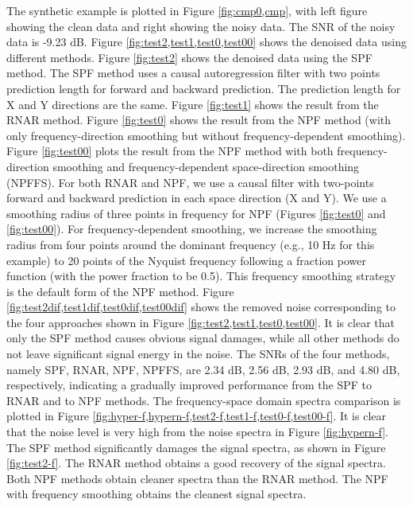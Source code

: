 The synthetic example is plotted in Figure \ref{fig:cmp0,cmp}, with left figure showing the clean data and right showing the noisy data. The SNR of the noisy data is -9.23 dB. Figure \ref{fig:test2,test1,test0,test00} shows the denoised data using different methods. Figure \ref{fig:test2} shows the denoised data using the SPF method. The SPF method uses a causal autoregression filter with two points prediction length for forward and backward prediction. The prediction length for X and Y directions are the same. Figure \ref{fig:test1} shows the result from the RNAR method. Figure \ref{fig:test0} shows the result from the NPF method (with only frequency-direction smoothing but without frequency-dependent smoothing). Figure \ref{fig:test00} plots the result from the NPF method with both frequency-direction smoothing and frequency-dependent space-direction smoothing (NPFFS). For both RNAR and NPF, we use a causal filter with two-points forward and backward prediction in each space direction (X and Y). We use a smoothing radius of three points in frequency for NPF (Figures \ref{fig:test0} and \ref{fig:test00}).  For frequency-dependent smoothing, we increase the smoothing radius from four points around the dominant frequency (e.g., 10 Hz for this example) to 20 points of the Nyquist frequency following a fraction power function (with the power fraction to be 0.5). This frequency smoothing strategy is the default form of the NPF method. Figure \ref{fig:test2dif,test1dif,test0dif,test00dif} shows the removed noise corresponding to the four approaches shown in Figure \ref{fig:test2,test1,test0,test00}.  It is clear that only the SPF method causes obvious signal damages, while all other methods do not leave significant signal energy in the noise. The SNRs of the four methods, namely SPF, RNAR, NPF, NPFFS, are 
2.34 dB, 2.56 dB, 2.93 dB, and 4.80 dB, respectively, indicating a gradually improved performance from the SPF to RNAR and to NPF methods. The frequency-space domain spectra comparison is plotted in Figure \ref{fig:hyper-f,hypern-f,test2-f,test1-f,test0-f,test00-f}. It is clear that the noise level is very high from the noise spectra in Figure \ref{fig:hypern-f}. The SPF method significantly damages the signal spectra, as shown in Figure \ref{fig:test2-f}. The RNAR method obtains a good recovery of the signal spectra. Both NPF methods obtain cleaner spectra than the RNAR method. The NPF with frequency smoothing obtains the cleanest signal spectra.
